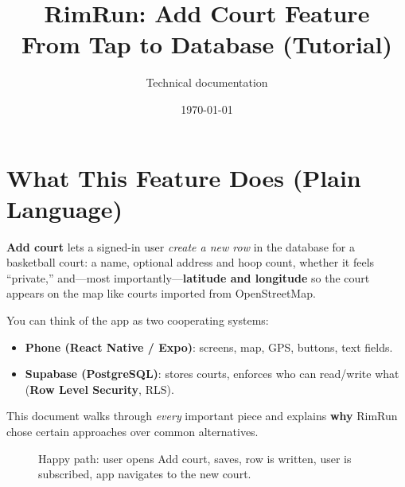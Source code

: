 \documentclass[11pt,a4paper]{article}
\title{\textbf{RimRun: Add Court Feature} \\ \large From Tap to Database (Tutorial)}
\author{Technical documentation}
\date{\today}
\begin{document}
\maketitle
\tableofcontents
\newpage

\section{What This Feature Does (Plain Language)}

\textbf{Add court} lets a signed-in user \emph{create a new row} in the database for a basketball court: a name, optional address and hoop count, whether it feels ``private,'' and---most importantly---\textbf{latitude and longitude} so the court appears on the map like courts imported from OpenStreetMap.

You can think of the app as two cooperating systems:
\begin{itemize}[noitemsep]
    \item \textbf{Phone (React Native / Expo)}: screens, map, GPS, buttons, text fields.
    \item \textbf{Supabase (PostgreSQL)}: stores courts, enforces who can read/write what (\textbf{Row Level Security}, RLS).
\end{itemize}

This document walks through \emph{every} important piece and explains \textbf{why} RimRun chose certain approaches over common alternatives.

\begin{figure}[h]
\centering
{}
\caption{Happy path: user opens Add court, saves, row is written, user is subscribed, app navigates to the new court.}
\end{figure}
\end{document}
